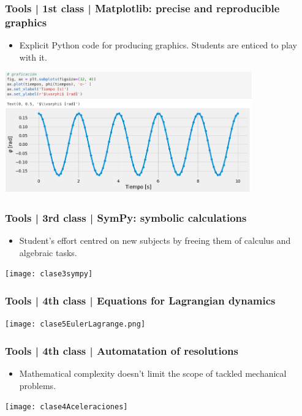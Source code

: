 \documentclass[aspectratio=169]{beamer}
\begin{document}
\begin{frame}
	\frametitle{Tools | 1st class | Matplotlib: precise and reproducible graphics}
	\begin{block}{}
		\begin{itemize}
			\item Explicit Python code for producing graphics. Students are enticed to play with it.
		\end{itemize}
	\includegraphics[width= 0.8\textwidth]{clase1gráficos}
	\end{block}
\end{frame}


\begin{frame}
	\frametitle{Tools | 3rd class | SymPy: symbolic calculations}
	\begin{block}{}
		\begin{itemize}
			\item Student's effort centred on new subjects by freeing them  of calculus and algebraic tasks.
		\end{itemize}
	\texttt{[image: clase3sympy]}
	\end{block}
\end{frame}


\begin{frame}
	\frametitle{Tools | 4th class | Equations for Lagrangian dynamics}
	\begin{block}{}
	\texttt{[image: clase5EulerLagrange.png]}
	\end{block}
\end{frame}


\begin{frame}
	\frametitle{Tools | 4th class | Automatation of resolutions}
	\begin{block}{}
		\begin{itemize}
			\item Mathematical complexity doesn't limit the scope of tackled mechanical problems.
		\end{itemize}
	\texttt{[image: clase4Aceleraciones]}
	\end{block}
\end{frame}
\end{document}
